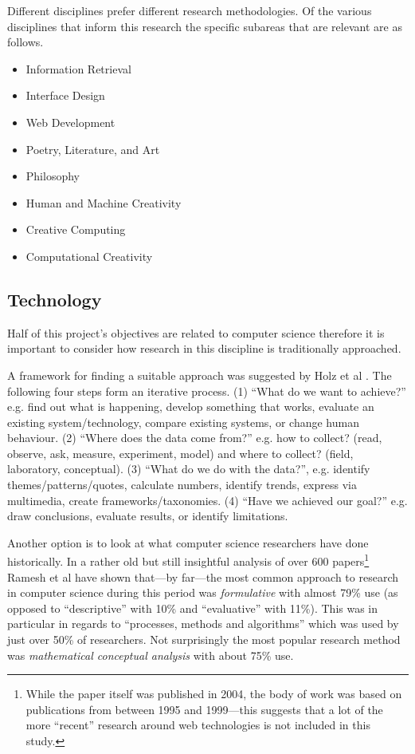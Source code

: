 Different disciplines prefer different research methodologies. Of the various disciplines that inform this research the specific subareas that are relevant are as follows.

\begin{itemize}
  \item Information Retrieval
  \item Interface Design
  \item Web Development
  \item Poetry, Literature, and Art
  \item Philosophy
  \item Human and Machine Creativity
  \item Creative Computing
  \item Computational Creativity
\end{itemize}


\subsection{Technology}

Half of this project's objectives are related to computer science therefore it is important to consider how research in this discipline is traditionally approached.

A framework for finding a suitable approach was suggested by Holz et al \autocite*{Holz2006}. The following four steps form an iterative process. (1) ``What do we want to achieve?'' e.g. find out what is happening, develop something that works, evaluate an existing system/technology, compare existing systems, or change human behaviour. (2) ``Where does the data come from?'' e.g. how to collect? (read, observe, ask, measure, experiment, model) and where to collect? (field, laboratory, conceptual). (3) ``What do we do with the data?'', e.g. identify themes/patterns/quotes, calculate numbers, identify trends, express via multimedia, create frameworks/taxonomies. (4) ``Have we achieved our goal?'' e.g. draw conclusions, evaluate results, or identify limitations.

Another option is to look at what computer science researchers have done historically. In a rather old but still insightful analysis of over 600 papers\footnote{While the paper itself was published in 2004, the body of work was based on publications from between 1995 and 1999---this suggests that a lot of the more ``recent'' research around web technologies is not included in this study.} Ramesh et al \autocite*{Ramesh2004} have shown that---by far---the most common approach to research in computer science during this period was \emph{formulative} with almost 79\% use (as opposed to ``descriptive'' with 10\% and ``evaluative'' with 11\%). This was in particular in regards to ``processes, methods and algorithms'' which was used by just over 50\% of researchers. Not surprisingly the most popular research method was \emph{mathematical conceptual analysis} with about 75\% use.

